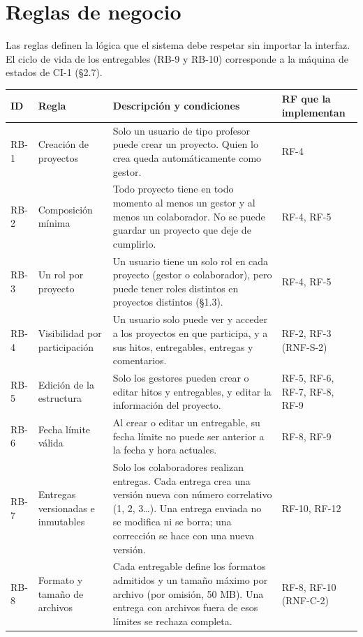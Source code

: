 \documentclass[10pt,a4paper]{article}
\newcommand{\hrow}{\rowcolor{encabezado}}
\newcommand{\h}[1]{\textbf{#1}}
\begin{document}
\clearpage
\section{Reglas de negocio}
Las reglas definen la lógica que el sistema debe respetar sin importar la interfaz. El ciclo de vida de los entregables (RB-9 y RB-10) corresponde a la máquina de estados de CI-1 (§2.7).

\begin{xltabular}{\linewidth}{|P{1.2cm}|P{3.8cm}|L|P{2.6cm}|}
\hline\hrow \h{ID} & \h{Regla} & \h{Descripción y condiciones} & \h{RF que la implementan} \\ \hline
\endhead
RB-1 & Creación de proyectos & Solo un usuario de tipo profesor puede crear un proyecto. Quien lo crea queda automáticamente como gestor. & RF-4 \\ \hline
RB-2 & Composición mínima & Todo proyecto tiene en todo momento al menos un gestor y al menos un colaborador. No se puede guardar un proyecto que deje de cumplirlo. & RF-4, RF-5 \\ \hline
RB-3 & Un rol por proyecto & Un usuario tiene un solo rol en cada proyecto (gestor o colaborador), pero puede tener roles distintos en proyectos distintos (§1.3). & RF-4, RF-5 \\ \hline
RB-4 & Visibilidad por participación & Un usuario solo puede ver y acceder a los proyectos en que participa, y a sus hitos, entregables, entregas y comentarios. & RF-2, RF-3 (RNF-S-2) \\ \hline
RB-5 & Edición de la estructura & Solo los gestores pueden crear o editar hitos y entregables, y editar la información del proyecto. & RF-5, RF-6, RF-7, RF-8, RF-9 \\ \hline
RB-6 & Fecha límite válida & Al crear o editar un entregable, su fecha límite no puede ser anterior a la fecha y hora actuales. & RF-8, RF-9 \\ \hline
RB-7 & Entregas versionadas e inmutables & Solo los colaboradores realizan entregas. Cada entrega crea una versión nueva con número correlativo (1, 2, 3…). Una entrega enviada no se modifica ni se borra; una corrección se hace con una nueva versión. & RF-10, RF-12 \\ \hline
RB-8 & Formato y tamaño de archivos & Cada entregable define los formatos admitidos y un tamaño máximo por archivo (por omisión, 50 MB). Una entrega con archivos fuera de esos límites se rechaza completa. & RF-8, RF-10 (RNF-C-2) \\ \hline

\end{xltabular}
\end{document}
